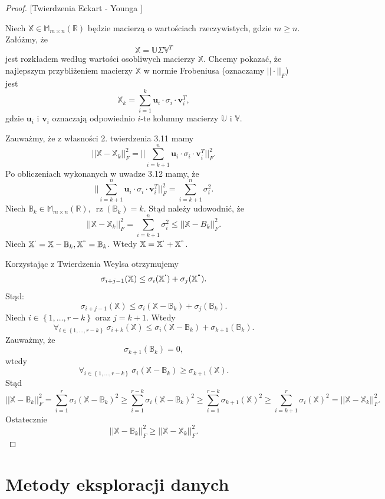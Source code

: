 \documentclass[12pt,a4paper]{report}
\newcommand{\set}[1]{\left\lbrace {#1} \right\rbrace}
\newcommand{\setR}{\mathbb{R}}
\newcommand{\rz}[1]{\operatorname{rz}\left({#1} \right)}
\begin{document}
\begin{proof}{[Twierdzenia Eckart - Younga {\citep[Tw. 4.21]{tsvdalra}}]} 

Niech $\mathbb{X} \in \mathbb{M}_{m\times n}(\setR)$ będzie macierzą o wartościach rzeczywistych, gdzie $m \geqslant n$.
Załóżmy, że
$$
\mathbb{X}=\mathbb{U} \Sigma \mathbb{V}^T
$$
jest rozkładem według wartości osobliwych macierzy $\mathbb{X}$.
Chcemy pokazać, że najlepszym przybliżeniem macierzy $\mathbb{X}$ w normie Frobeniusa (oznaczamy $||\cdot||_F$) jest
$$
\mathbb{X}_k = \sum_{i=1}^k \mathbf{u}_i\cdot \sigma_i \cdot \mathbf{v}_i^T,
$$
gdzie $\mathbf{u}_i$ i $\mathbf{v}_i$ oznaczają odpowiednio $i$-te kolumny macierzy $\mathbb{U}$ i $\mathbb{V}$.

Zauważmy, że z własności 2. twierdzenia 3.11 mamy
$$
||\mathbb{X} - \mathbb{X}_k||_F^2 = ||\sum_{i=k+1}^n \mathbf{u}_i \cdot \sigma_i \cdot \mathbf{v}_i^T||_F^2.
$$
Po obliczeniach wykonanych w uwadze 3.12 mamy, że
$$
||\sum_{i=k+1}^n \mathbf{u}_i \cdot \sigma_i \cdot \mathbf{v}_i^T||_F^2 =\sum_{i=k+1}^n \sigma_i^2.
$$
Niech $\mathbb{B}_k \in \mathbb{M}_{m \times n}(\setR), \: \rz{\mathbb{B}_k} = k$. 
Stąd należy udowodnić, że
$$
||\mathbb{X} - \mathbb{X}_k||_F^2 = \sum_{i=k+1}^n \sigma_i^2 \leqslant ||\mathbb{X} - B_k||_F^2.
$$
Niech $\mathbb{X}^{`} = \mathbb{X}-\mathbb{B}_k, \mathbb{X}^{``} = \mathbb{B}_k$.
Wtedy $\mathbb{X} = \mathbb{X}^{`} + \mathbb{X}^{``}$. 

Korzystając z Twierdzenia Weylsa otrzymujemy
$$
\sigma_{i+j-1}(\mathbb{X})\leq \sigma_{i}(\mathbb{X}^{`}) + \sigma_j(\mathbb{X}^{``}).
$$ 
Stąd:
$$
\sigma_{i+j-1}(\mathbb{X})\leq \sigma_{i}(\mathbb{X} - \mathbb{B}_k) + \sigma_j(\mathbb{B}_k).
$$ 
Niech $i \in \set{1, \ldots, r-k}$ oraz $j= k+1$. Wtedy
$$
\forall_{i \in \set{1, \ldots, r-k}} \: \sigma_{i+k}(\mathbb{X})\leq \sigma_{i}(\mathbb{X} - \mathbb{B}_k) + \sigma_{k+1}(\mathbb{B}_k).
$$ 
Zauważmy, że
$$
\sigma_{k+1}(\mathbb{B}_k)=0,
$$
wtedy
$$
\forall_{i \in \set{1, \ldots, r-k}} \: \sigma_i(\mathbb{X}-\mathbb{B}_k)\geq \sigma_{k+1}(\mathbb{X}).
$$
Stąd
$$
||\mathbb{X} - \mathbb{B}_k||_F^2 = \sum_{i=1}^r \sigma_i(\mathbb{X}-\mathbb{B}_k)^2 \geq \sum_{i=1}^{r-k} \sigma_i(\mathbb{X}-\mathbb{B}_k)^2 \geq \sum_{i=1}^{r-k} \sigma_{k+1}(\mathbb{X})^2 \geq \sum_{i = k+1}^r \sigma_i(\mathbb{X})^2 = ||\mathbb{X}-\mathbb{X}_k||_F^2 .
$$
Ostatecznie
$$
||\mathbb{X} - \mathbb{B}_k||_F^2 \geqslant ||\mathbb{X}-\mathbb{X}_k||_F^2.
$$
\end{proof}


\section{Metody eksploracji danych}
\end{document}
